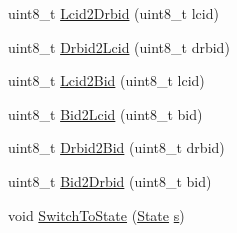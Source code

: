 \begin{DoxyCompactItemize}
\item 
uint8\+\_\+t \hyperlink{classns3_1_1UeManager_add2d87f0743ed88c0cd89da5f65d04a0}{Lcid2\+Drbid} (uint8\+\_\+t lcid)
\item 
uint8\+\_\+t \hyperlink{classns3_1_1UeManager_af0ba90c3b4fe3300796ffc03de328f73}{Drbid2\+Lcid} (uint8\+\_\+t drbid)
\item 
uint8\+\_\+t \hyperlink{classns3_1_1UeManager_a585341e3dd6501f657cb4b4c1efa0f40}{Lcid2\+Bid} (uint8\+\_\+t lcid)
\item 
uint8\+\_\+t \hyperlink{classns3_1_1UeManager_a5f3f8e891803bc57dc35af2c6c5a286d}{Bid2\+Lcid} (uint8\+\_\+t bid)
\item 
uint8\+\_\+t \hyperlink{classns3_1_1UeManager_a7f9cf28eee4b60f195e9f4577a8a3a35}{Drbid2\+Bid} (uint8\+\_\+t drbid)
\item 
uint8\+\_\+t \hyperlink{classns3_1_1UeManager_ac8c03e2c3f2bbb67f9c13df62e6464b5}{Bid2\+Drbid} (uint8\+\_\+t bid)
\item 
void \hyperlink{classns3_1_1UeManager_af2b5ad90fc6f16ffc4a91fbe8a522472}{Switch\+To\+State} (\hyperlink{classns3_1_1UeManager_a2f4085fdd18d7125c27da44a5b8b6808}{State} \hyperlink{generate__test__data__lte__sinr_8m_ad83eeb3a142285d1243a08c6b7026df8}{s})
\end{DoxyCompactItemize}
